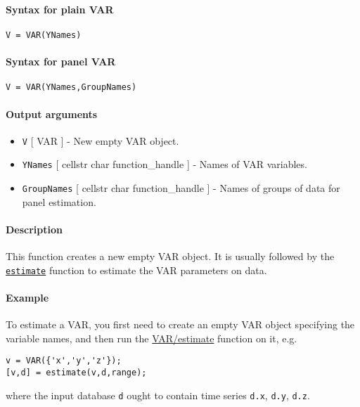 


	\paragraph{Syntax for plain VAR}

\begin{verbatim}
V = VAR(YNames)
\end{verbatim}

\paragraph{Syntax for panel VAR}

\begin{verbatim}
V = VAR(YNames,GroupNames)
\end{verbatim}

\paragraph{Output arguments}

\begin{itemize}
\item
  \texttt{V} {[} VAR {]} - New empty VAR object.
\item
  \texttt{YNames} {[} cellstr \textbar{} char \textbar{}
  function\_handle {]} - Names of VAR variables.
\item
  \texttt{GroupNames} {[} cellstr \textbar{} char \textbar{}
  function\_handle {]} - Names of groups of data for panel estimation.
\end{itemize}

\paragraph{Description}

This function creates a new empty VAR object. It is usually followed by
the \href{VAR/estimate}{\texttt{estimate}} function to estimate the VAR
parameters on data.

\paragraph{Example}

To estimate a VAR, you first need to create an empty VAR object
specifying the variable names, and then run the \url{VAR/estimate}
function on it, e.g.

\begin{verbatim}
v = VAR({'x','y','z'});
[v,d] = estimate(v,d,range);
\end{verbatim}

where the input database \texttt{d} ought to contain time series
\texttt{d.x}, \texttt{d.y}, \texttt{d.z}.


